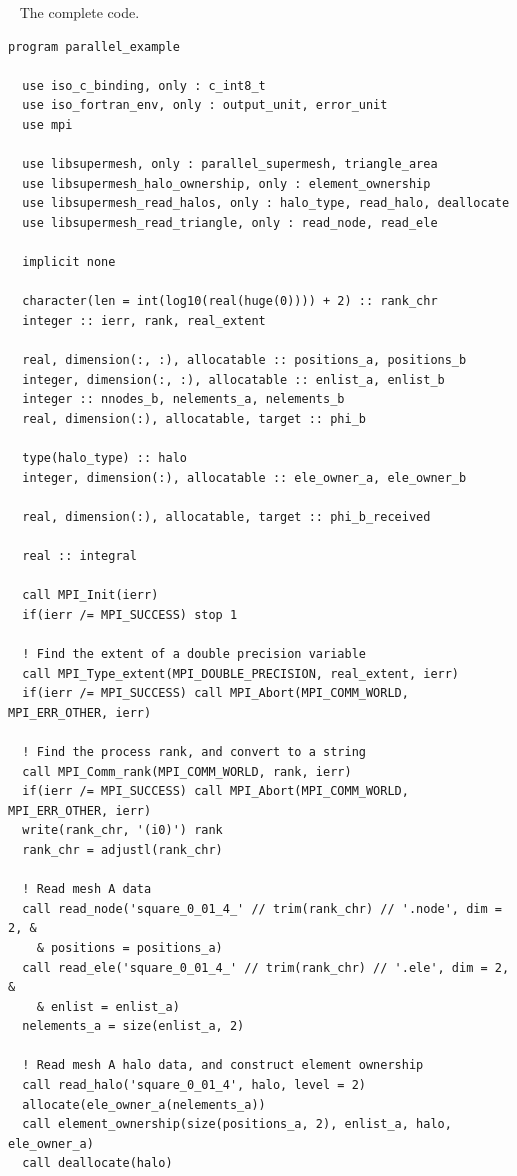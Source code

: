 \documentclass{article}
\begin{document}
~\newline
The complete code.
\begin{lstlisting}[language=FORTRAN]
program parallel_example

  use iso_c_binding, only : c_int8_t
  use iso_fortran_env, only : output_unit, error_unit
  use mpi
  
  use libsupermesh, only : parallel_supermesh, triangle_area
  use libsupermesh_halo_ownership, only : element_ownership
  use libsupermesh_read_halos, only : halo_type, read_halo, deallocate
  use libsupermesh_read_triangle, only : read_node, read_ele

  implicit none
  
  character(len = int(log10(real(huge(0)))) + 2) :: rank_chr
  integer :: ierr, rank, real_extent
  
  real, dimension(:, :), allocatable :: positions_a, positions_b
  integer, dimension(:, :), allocatable :: enlist_a, enlist_b
  integer :: nnodes_b, nelements_a, nelements_b
  real, dimension(:), allocatable, target :: phi_b
  
  type(halo_type) :: halo
  integer, dimension(:), allocatable :: ele_owner_a, ele_owner_b
  
  real, dimension(:), allocatable, target :: phi_b_received
  
  real :: integral
  
  call MPI_Init(ierr)
  if(ierr /= MPI_SUCCESS) stop 1
  
  ! Find the extent of a double precision variable
  call MPI_Type_extent(MPI_DOUBLE_PRECISION, real_extent, ierr)
  if(ierr /= MPI_SUCCESS) call MPI_Abort(MPI_COMM_WORLD, MPI_ERR_OTHER, ierr)
  
  ! Find the process rank, and convert to a string
  call MPI_Comm_rank(MPI_COMM_WORLD, rank, ierr)
  if(ierr /= MPI_SUCCESS) call MPI_Abort(MPI_COMM_WORLD, MPI_ERR_OTHER, ierr)
  write(rank_chr, '(i0)') rank
  rank_chr = adjustl(rank_chr)
  
  ! Read mesh A data
  call read_node('square_0_01_4_' // trim(rank_chr) // '.node', dim = 2, &
    & positions = positions_a)
  call read_ele('square_0_01_4_' // trim(rank_chr) // '.ele', dim = 2, &
    & enlist = enlist_a)
  nelements_a = size(enlist_a, 2)
    
  ! Read mesh A halo data, and construct element ownership
  call read_halo('square_0_01_4', halo, level = 2)
  allocate(ele_owner_a(nelements_a))
  call element_ownership(size(positions_a, 2), enlist_a, halo, ele_owner_a)
  call deallocate(halo)
    

\end{lstlisting}
\end{document}
